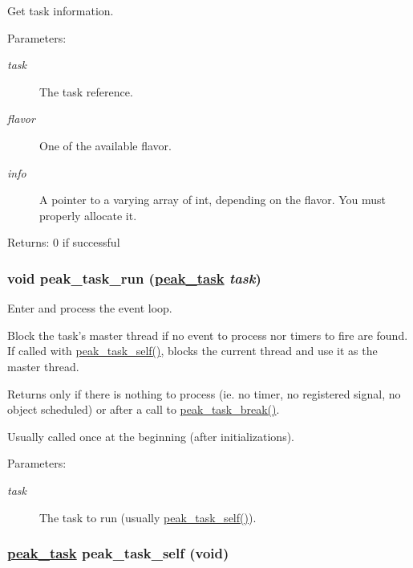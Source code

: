 Get task information. 

\begin{Desc}
\item[Parameters:]
\begin{description}
\item[{\em task}]The task reference. \item[{\em flavor}]One of the available flavor. \item[{\em info}]A pointer to a varying array of int, depending on the flavor. You must properly allocate it.\end{description}
\end{Desc}
\begin{Desc}
\item[Returns:]0 if successful \end{Desc}
\hypertarget{group__task__common_ga8}{
\subsubsection[peak\_\-task\_\-run]{\setlength{\rightskip}{0pt plus 5cm}void peak\_\-task\_\-run (\hyperlink{group__task__common_ga0}{peak\_\-task} {\em task})}}
\label{group__task__common_ga8}


Enter and process the event loop. 

Block the task's master thread if no event to process nor timers to fire are found. If called with \hyperlink{group__task__common_ga8}{peak\_\-task\_\-self()}, blocks the current thread and use it as the master thread.\par
 Returns only if there is nothing to process (ie. no timer, no registered signal, no object scheduled) or after a call to \hyperlink{group__task__common_ga20}{peak\_\-task\_\-break()}.\par
 Usually called once at the beginning (after initializations).

\begin{Desc}
\item[Parameters:]
\begin{description}
\item[{\em task}]The task to run (usually \hyperlink{group__task__common_ga8}{peak\_\-task\_\-self()}). \end{description}
\end{Desc}
\hypertarget{group__task__common_ga4}{
\subsubsection[peak\_\-task\_\-self]{\setlength{\rightskip}{0pt plus 5cm}\hyperlink{group__task__common_ga0}{peak\_\-task} peak\_\-task\_\-self (void)}}
\label{group__task__common_ga4}


